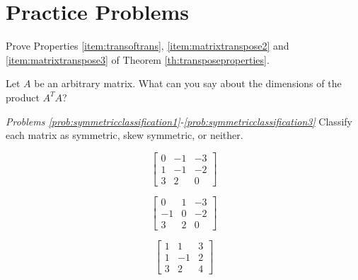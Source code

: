 \documentclass{ximera}
\begin{document}
\section*{Practice Problems}


\begin{problem}\label{prob:transpropsproofs} Prove Properties \ref{item:transoftrans}, \ref{item:matrixtranspose2} and \ref{item:matrixtranspose3} of Theorem \ref{th:transposeproperties}.
\end{problem}

\begin{problem}\label{prob:ATtimesAdimensions} Let $A$ be an arbitrary matrix.  What can you say about the dimensions of the product $A^TA$?
\end{problem}

\emph{Problems \ref{prob:symmetricclassification1}-\ref{prob:symmetricclassification3}}
Classify each matrix as symmetric, skew symmetric, or neither.

\begin{problem}\label{prob:symmetricclassification1}
$$\begin{bmatrix}
0 & -1 & -3\\
1 & -1 & -2\\
3 &  2 &  0
\end{bmatrix}$$
\begin{multipleChoice}
   \end{multipleChoice}
\end{problem}

\begin{problem}\label{prob:symmetricclassification2}
$$\begin{bmatrix}
0 & 1 & -3\\
-1 & 0 & -2\\
3 &  2 &  0
\end{bmatrix}$$
\begin{multipleChoice}
   \end{multipleChoice}
\end{problem}

\begin{problem}\label{prob:symmetricclassification3}
$$\begin{bmatrix}
1 & 1 & 3\\
1 & -1 & 2\\
3 &  2 &  4
\end{bmatrix}$$
\begin{multipleChoice}
   \end{multipleChoice}
\end{problem}
\end{document}
